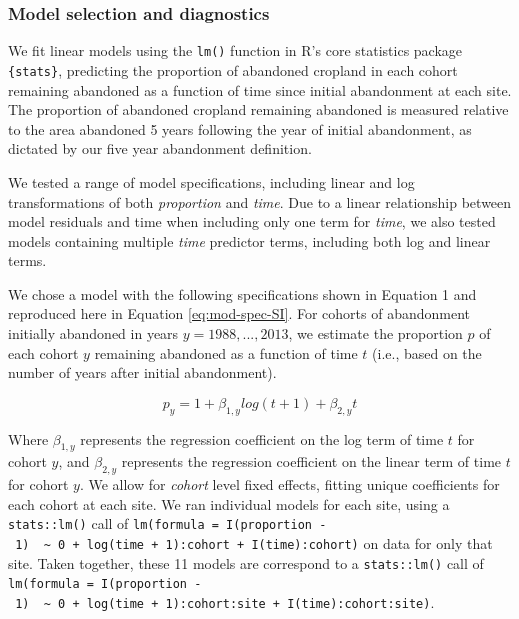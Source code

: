 \documentclass[
]{article}
\begin{document}
\hypertarget{model-selection-and-diagnostics}{%
\subsubsection{Model selection and diagnostics}\label{model-selection-and-diagnostics}}

We fit linear models using the \texttt{lm()} function in R's core statistics package \texttt{\{stats\}}, predicting the proportion of abandoned cropland in each cohort remaining abandoned as a function of time since initial abandonment at each site.
The proportion of abandoned cropland remaining abandoned is measured relative to the area abandoned 5 years following the year of initial abandonment, as dictated by our five year abandonment definition.

We tested a range of model specifications, including linear and log transformations of both \emph{proportion} and \emph{time}.
Due to a linear relationship between model residuals and time when including only one term for \emph{time}, we also tested models containing multiple \emph{time} predictor terms, including both log and linear terms.

We chose a model with the following specifications shown in Equation 1 and reproduced here in Equation \eqref{eq:mod-spec-SI}.
For cohorts of abandonment initially abandoned in years \(y = 1988, ... , 2013\), we estimate the proportion \(p\) of each cohort \(y\) remaining abandoned as a function of time \(t\) (i.e., based on the number of years after initial abandonment).

\begin{equation}
p_{y} = 1 + \beta_{1,y} log(t + 1) + \beta_{2,y} t \label{eq:mod-spec-SI}
\end{equation}

Where \(\beta_{1,y}\) represents the regression coefficient on the log term of time \(t\) for cohort \(y\), and \(\beta_{2,y}\) represents the regression coefficient on the linear term of time \(t\) for cohort \(y\).
We allow for \emph{cohort} level fixed effects, fitting unique coefficients for each cohort at each site.
We ran individual models for each site, using a \texttt{stats::lm()} call of \texttt{lm(formula\ =\ I(proportion\ -\ 1)\ \ \textasciitilde{}\ 0\ +\ log(time\ +\ 1):cohort\ +\ I(time):cohort)} on data for only that site.
Taken together, these 11 models are correspond to a \texttt{stats::lm()} call of \texttt{lm(formula\ =\ I(proportion\ -\ 1)\ \ \textasciitilde{}\ 0\ +\ log(time\ +\ 1):cohort:site\ +\ I(time):cohort:site)}.
\end{document}
